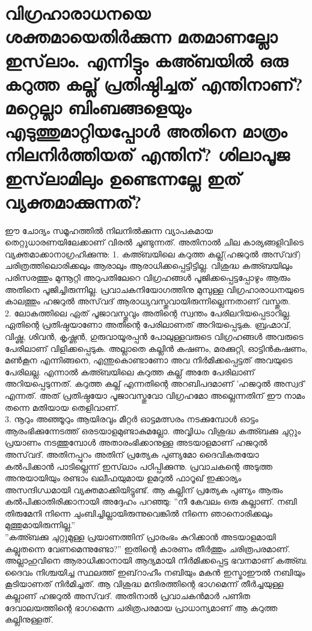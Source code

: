   \section{വിഗ്രഹാരാധനയെ ശക്തമായെതിര്‍ക്കുന്ന മതമാണല്ലോ ഇസ്‌ലാം. എന്നിട്ടും കഅ്ബയില്‍ ഒരു കറുത്ത കല്ല് പ്രതിഷ്ഠിച്ചത് എന്തിനാണ്? മറ്റെല്ലാ ബിംബങ്ങളെയും എടുത്തുമാറ്റിയപ്പോള്‍ അതിനെ മാത്രം നിലനിര്‍ത്തിയത് എന്തിന്? ശിലാപൂജ ഇസ്‌ലാമിലും ഉണ്ടെന്നല്ലേ ഇത് വ്യക്തമാക്കുന്നത്? }   
 ഈ ചോദ്യം സമൂഹത്തില്‍ നിലനില്‍ക്കുന്ന വ്യാപകമായ തെറ്റുധാരണയിലേക്കാണ് വിരല്‍ ചൂണ്ടുന്നത്. അതിനാല്‍ ചില കാര്യങ്ങളിവിടെ വ്യക്തമാക്കാനാഗ്രഹിക്കുന്നു:
1. കഅ്ബയിലെ കറുത്ത കല്ല്(ഹജറുല്‍ അസ്‌വദ്) ചരിത്രത്തിലൊരിക്കലും ആരാലും ആരാധിക്കപ്പെട്ടിട്ടില്ല. വിശുദ്ധ കഅ്ബയിലും പരിസരത്തും മുന്നൂറ്റി അറുപതിലേറെ വിഗ്രഹങ്ങള്‍ പൂജിക്കപ്പെട്ടപ്പോഴും ആരും അതിനെ പൂജിച്ചിരുന്നില്ല. പ്രവാചകനിയോഗത്തിനു മുമ്പുള്ള വിഗ്രഹാരാധനയുടെ കാലത്തും ഹജറുല്‍ അസ്‌വദ് ആരാധ്യവസ്തുവായിരുന്നില്ലെന്നതാണ് വസ്തുത.\\
2. ലോകത്തിലെ ഏത് പൂജാവസ്തുവും അതിന്റെ സ്വന്തം പേരിലറിയപ്പെടാറില്ല. ഏതിന്റെ പ്രതിഷ്ഠയാണോ അതിന്റെ പേരിലാണത് അറിയപ്പെടുക. ബ്രഹ്മാവ്, വിഷ്ണു, ശിവന്‍, കൃഷ്ണന്‍, ഗുരുവായൂരപ്പന്‍ പോലുള്ളവരുടെ വിഗ്രഹങ്ങള്‍ അവരുടെ പേരിലാണ് വിളിക്കപ്പെടുക. അല്ലാതെ കല്ലിന്‍ കഷണം, മരക്കുറ്റി, ഓട്ടിന്‍കഷണം, മണ്‍കൂന എന്നിങ്ങനെ, എന്തുകൊണ്ടാണോ അവ നിര്‍മിക്കപ്പെട്ടത് അവയുടെ പേരിലല്ല. എന്നാല്‍ കഅ്ബയിലെ കറുത്ത കല്ല് അതേ പേരിലാണ് അറിയപ്പെടുന്നത്. കറുത്ത കല്ല് എന്നതിന്റെ അറബിപദമാണ് 'ഹജറുല്‍ അസ്വദ്' എന്നത്. അത് പ്രതിഷ്ഠയോ പൂജാവസ്തുവോ വിഗ്രഹമോ അല്ലെന്നതിന് ഈ നാമം തന്നെ മതിയായ തെളിവാണ്.\\
3. നൂറും അഞ്ഞൂറും ആയിരവും മീറ്റര്‍ ഓട്ടമത്സരം നടക്കുമ്പോള്‍ ഓട്ടം ആരംഭിക്കുന്നേടത്ത് ഒരടയാളമുണ്ടാകുമല്ലോ. അവ്വിധം വിശുദ്ധ കഅ്ബക്കു ചുറ്റും പ്രയാണം നടത്തുമ്പോള്‍ അതാരംഭിക്കാനുള്ള അടയാളമാണ് ഹജറുല്‍ അസ്‌വദ്. അതിനപ്പുറം അതിന് പ്രത്യേക പുണ്യമോ ദൈവികതയോ കല്‍പിക്കാന്‍ പാടില്ലെന്ന് ഇസ്‌ലാം പഠിപ്പിക്കുന്നു. പ്രവാചകന്റെ അടുത്ത അനുയായിയും രണ്ടാം ഖലീഫയുമായ ഉമറുല്‍ ഫാറൂഖ് ഇക്കാര്യം അസന്ദിഗ്ധമായി വ്യക്തമാക്കിയിട്ടുണ്ട്. ആ കല്ലിന് പ്രത്യേക പുണ്യം ആരും കല്‍പിക്കാതിരിക്കാനായി അദ്ദേഹം പറഞ്ഞു: ''നീ കേവലം ഒരു കല്ലാണ്. നബി തിരുമേനി നിന്നെ ചുംബിച്ചില്ലായിരുന്നുവെങ്കില്‍ നിന്നെ ഞാനൊരിക്കലും മുത്തുമായിരുന്നില്ല.''\\
''കഅ്ബക്കു ചുറ്റുമുള്ള പ്രയാണത്തിന് പ്രാരംഭം കുറിക്കാന്‍ അടയാളമായി കല്ലുതന്നെ വേണമെന്നുണ്ടോ?''                                                                                                           ഇതിന്റെ കാരണം തീര്‍ത്തും ചരിത്രപരമാണ്. അല്ലാഹുവിനെ ആരാധിക്കാനായി ആദ്യമായി നിര്‍മിക്കപ്പെട്ട ഭവനമാണ് കഅ്ബ. ദൈവം നിശ്ചയിച്ച സ്ഥലത്ത് ഇബ്‌റാഹീം നബിയും മകന്‍ ഇസ്മാഈല്‍ നബിയും കൂടിയാണത് നിര്‍മിച്ചത്. ആ വിശുദ്ധ മന്ദിരത്തിന്റെ ഭാഗമെന്ന് തീര്‍ച്ചയുള്ള കല്ലാണ് ഹജറുല്‍ അസ്‌വദ്. അതിനാല്‍ പ്രവാചകന്‍മാര്‍ പണിത ദേവാലയത്തിന്റെ ഭാഗമെന്ന ചരിത്രപരമായ പ്രാധാന്യമാണ് ആ കറുത്ത കല്ലിനുള്ളത്. 
